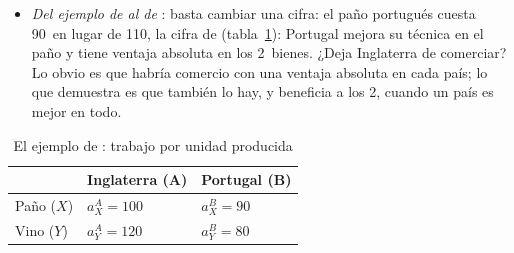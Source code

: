 \documentclass[11pt]{article}
\begin{document}
\begin{itemize}
\item \emph{Del ejemplo de  al de }: basta cambiar una cifra: el paño portugués cuesta 90~en lugar de 110, la cifra de  (tabla~\ref{tab:pano-vino}): Portugal mejora su técnica en el paño y tiene ventaja absoluta en los 2~bienes. ¿Deja Inglaterra de comerciar? Lo obvio es que habría comercio con una ventaja absoluta en cada país; lo que  demuestra es que también lo hay, y beneficia a los 2, cuando un país es mejor en todo.
\end{itemize}
\begin{table}[H]
\centering
\caption{El ejemplo de : trabajo por unidad producida}\label{tab:pano-vino}
\begin{tabular}{>{\raggedright\arraybackslash}m{4.4cm}>{\centering\arraybackslash}m{3.2cm}>{\centering\arraybackslash}m{3.2cm}}
\toprule
\rowcolor{tceeazulpalido} & \textbf{Inglaterra (A)} & \textbf{Portugal (B)}\\
\midrule
Paño ($X$) & \cellcolor{tceesalvia}\textcolor{tceeazul}{$a_X^A=100$} & $a_X^B=90$\\
\addlinespace[0.3em]
Vino ($Y$) & $a_Y^A=120$ & \cellcolor{tceesalvia}\textcolor{tceeazul}{$a_Y^B=80$}\\
\bottomrule
\end{tabular}
\end{table}
\end{document}
